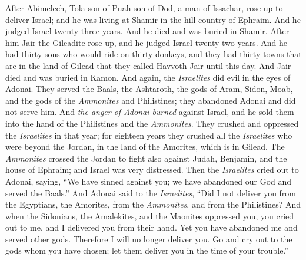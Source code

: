 \begin{biblechapter} %
 After Abimelech, Tola son of Puah son of Dod, a man of Issachar, rose up to deliver Israel; and he was living at Shamir in the hill country of Ephraim.
\verse And he judged Israel twenty-three years. And he died and was buried in Shamir.
\verse After him Jair the Gileadite rose up, and he judged Israel twenty-two years.
\verse And he had thirty sons who would ride on thirty donkeys, and they had thirty towns that are in the land of Gilead that they called Havvoth Jair until this day.
\verse And Jair died and was buried in Kamon.
\verse And again, the \textit{Israelites} did evil in the eyes of Adonai. They served the Baals, the Ashtaroth, the gods of Aram, Sidon, Moab, and the gods of the \textit{Ammonites} and Philistines; they abandoned Adonai and did not serve him.
\verse And \textit{the anger of Adonai burned} against Israel, and he sold them into the hand of the Philistines and the \textit{Ammonites}.
\verse They crushed and oppressed the \textit{Israelites} in that year; for eighteen years they crushed all the \textit{Israelites} who were beyond the Jordan, in the land of the Amorites, which is in Gilead.
\verse The \textit{Ammonites} crossed the Jordan to fight also against Judah, Benjamin, and the house of Ephraim; and Israel was very distressed.
\verse Then the \textit{Israelites} cried out to Adonai, saying, “We have sinned against you; we have abandoned our God and served the Baals.”
\verse And Adonai said to the \textit{Israelites}, “Did I not deliver you from the Egyptians, the Amorites, from the \textit{Ammonites}, and from the Philistines?
\verse And when the Sidonians, the Amalekites, and the Maonites oppressed you, you cried out to me, and I delivered you from their hand.
\verse Yet you have abandoned me and served other gods. Therefore I will no longer deliver you.
\verse Go and cry out to the gods whom you have chosen; let them deliver you in the time of your trouble.”

\end{biblechapter}
